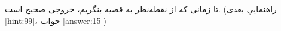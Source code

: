 \section{}
\paragraph{}\label{hint:206}
تا زمانی که از نقطه‌نظر  به قضیه بنگریم، خروجی صحیح است. (راهنماییِ بعدی \ref{hint:99}، جواب \ref{answer:15})